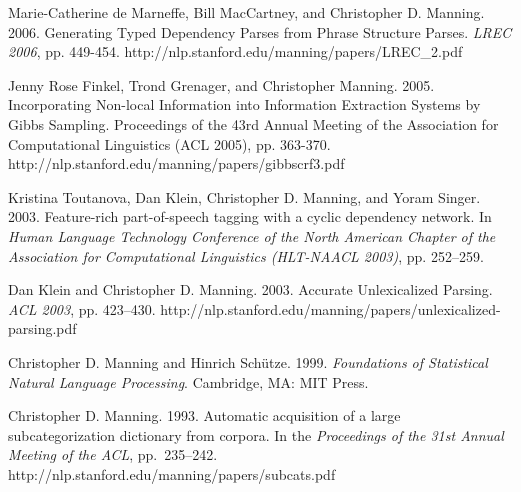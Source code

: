 \documentclass[11pt]{article}
\def\url#1{{\small\sf #1}}
\begin{document}
\begin{vita}
\begin{Other Key Publications}
\item Marie-Catherine de Marneffe, Bill MacCartney, and Christopher D. Manning. 2006. Generating Typed Dependency Parses from Phrase Structure Parses. \emph{LREC 2006}, pp. 449-454. \url{http://nlp.stanford.edu/\texttildelow manning/papers/LREC\_2.pdf}

\item  Jenny Rose Finkel, Trond Grenager, and Christopher Manning. 2005. Incorporating Non-local Information into Information Extraction Systems by Gibbs Sampling. Proceedings of the 43rd Annual Meeting of the Association for Computational Linguistics (ACL 2005), pp. 363-370. \url{http://nlp.stanford.edu/\texttildelow manning/papers/gibbscrf3.pdf}

\item 
Kristina Toutanova, Dan Klein, Christopher D. Manning, and Yoram Singer.
2003. Feature-rich part-of-speech tagging with a cyclic dependency network.
In \emph{Human Language Technology Conference of the North American Chapter
of the Association for Computational Linguistics (HLT-NAACL 2003)}, pp.
252--259.

\item Dan Klein and Christopher D. Manning. 2003. Accurate Unlexicalized Parsing. \emph{ACL 2003}, pp. 423--430. \url{http://nlp.stanford.edu/\texttildelow manning/papers/unlexicalized-parsing.pdf}


\item Christopher D. Manning and Hinrich Sch\"utze. 1999. \emph{Foundations
of Statistical Natural Language Processing}.  Cambridge, MA: MIT Press.

\item Christopher D. Manning. 1993. Automatic acquisition of a large
subcategorization dictionary 
from corpora.  In the {\em Proceedings of the 31st Annual Meeting
of the {ACL}}, pp.~235--242.
\url{http://nlp.stanford.edu/\texttildelow manning/papers/subcats.pdf}

\end{Other Key Publications}


\end{vita}
\end{document}
